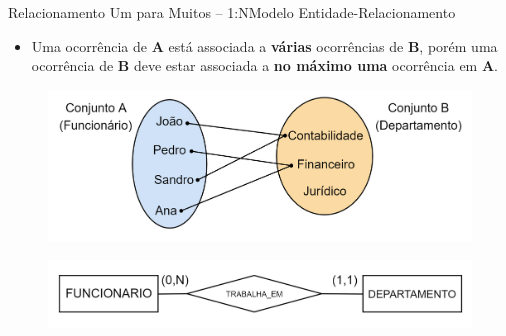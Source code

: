 \documentclass[t]{beamer}
\begin{document}
\begin{ftst}{Relacionamento Um para Muitos – 1:N}{Modelo Entidade-Relacionamento}
\begin{itemize}
    \item Uma ocorrência de \textbf{A} está associada a \textbf{várias} ocorrências de \textbf{B}, porém uma ocorrência de \textbf{B} deve estar associada a \textbf{no máximo uma} ocorrência em \textbf{A}.
\end{itemize}
\begin{figure}
    \centering
    \includegraphics[scale=0.15]{Figuras/01_17.png}
\end{figure}
\begin{figure}
    \centering
    \includegraphics[scale=0.2]{Figuras/01_16.png}
\end{figure}


\end{ftst}

\end{document}
